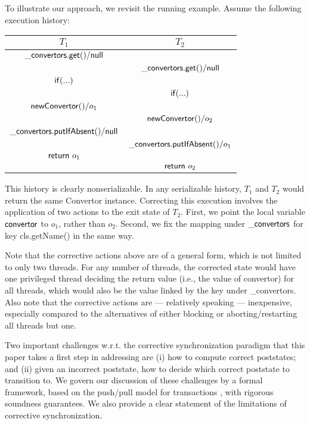 To illustrate our approach, we revisit the running example. Assume the following execution history:
\begin{center}
	\begin{tabular}{c||c}
		$T_1$ & $T_2$ \\
		\hline
		${\sf \_convertors.get()} / {\sf null}$ &  \\
															  & ${\sf \_convertors.get()} / {\sf null}$ \\
		${\sf if (...)}$ 								   &							\\
															  & ${\sf if (...)}$ \\
		${\sf newConvertor()} / o_1$		& \\
															  & ${\sf newConvertor()} / o_2$ \\
		${\sf \_convertors.putIfAbsent()} / {\sf null}$ &  \\
									& 		${\sf \_convertors.putIfAbsent()} / o_1$ \\
		${\sf return}\ o_1$ & \\
									& ${\sf return}\ o_2$ \\
	\end{tabular}
\end{center}
This history is clearly nonserializable. In any serializable history, $T_1$ and $T_2$ would return the same {\sf Convertor} instance. Correcting this execution involves the application of two actions to the exit state of $T_2$. First, we point the local variable ${\sf convertor}$ to $o_1$, rather than $o_2$. Second, we fix the mapping under ${\sf \_convertors}$ for key {\sf cls.getName()} in the same way.

Note that the corrective actions above are of a general form, which is not limited to only two threads. For any number of threads, the corrected state would have one privileged thread deciding the return value (i.e., the value of {\sf convertor}) for all threads, which would also be the value linked by the key under {\sf \_convertors}. Also note that the corrective actions are --- relatively speaking --- inexpensive, especially compared to the alternatives of either blocking or aborting/restarting all threads but one.

Two important challenges w.r.t. the corrective synchronization paradigm that this paper takes a first step in addressing are (i) how to compute correct poststates; and (ii) given an incorrect poststate, how to decide which correct poststate to transition to. We govern our discussion of these challenges by a formal framework, based on the push/pull model for transactions \cite{KoskinenP15}, with rigorous soundness guarantees. We also provide a clear statement of the limitations of corrective synchronization.

